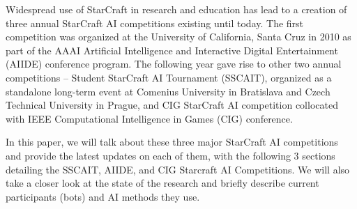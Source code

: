 Widespread use of StarCraft in research and education has lead to a creation of three annual StarCraft AI competitions existing until today. The first competition was organized at the University of California, Santa Cruz in 2010 as part of the AAAI Artificial Intelligence and Interactive Digital Entertainment (AIIDE) conference program. The following year gave rise to other two annual competitions -- Student StarCraft AI Tournament (SSCAIT), organized as a standalone long-term event at Comenius University in Bratislava and Czech Technical University in Prague, and CIG StarCraft AI competition collocated with IEEE Computational Intelligence in Games (CIG) conference.

In this paper, we will talk about these three major StarCraft AI competitions and provide the latest updates on each of them, with the following 3 sections detailing the SSCAIT, AIIDE, and CIG Starcraft AI Competitions. We will also take a closer look at the state of the research and briefly describe current participants (bots) and AI methods they use.



